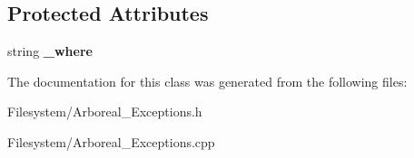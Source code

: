\subsection*{Protected Attributes}
\begin{DoxyCompactItemize}
\item 
\mbox{\label{classarboreal__exception_a73559e45af28b0804b66b04df4c04270}} 
string {\bfseries \+\_\+where}
\end{DoxyCompactItemize}


The documentation for this class was generated from the following files\+:\begin{DoxyCompactItemize}
\item 
Filesystem/Arboreal\+\_\+\+Exceptions.\+h\item 
Filesystem/Arboreal\+\_\+\+Exceptions.\+cpp\end{DoxyCompactItemize}
